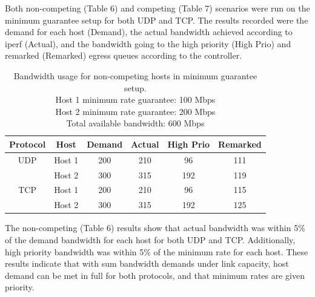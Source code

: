 \documentclass[accepted,single]{gipaper}
\begin{document}
Both non-competing (Table 6) and competing (Table 7) scenarios were run on the minimum guarantee setup for both UDP and TCP. The results recorded were the demand for each host (Demand), the actual bandwidth achieved according to iperf (Actual), and the bandwidth going to the high priority (High Prio) and remarked (Remarked) egress queues according to the controller. 

\begin{table}[h]
	\label{mg_nc}
	\vspace{-2mm}
	\begin{center}
		\begin{small}
		\setlength\tabcolsep{1.5pt}
			\begin{tabular}{cccccc}
				Protocol & Host & Demand & Actual & High Prio & Remarked \\
				\hline
				UDP & Host 1 & 200 & 210 & 96 & 111\\
				    & Host 2 & 300 & 315 & 192 & 119\\
				\hline
				TCP & Host 1 & 200 & 210 & 96 & 115\\
				    & Host 2 & 300 & 315 & 192 & 125\\
			\end{tabular}
		\end{small}
	\end{center}
	\caption{Bandwidth usage for non-competing hosts in minimum guarantee setup.\\
	Host 1 minimum rate guarantee: 100 Mbps\\
	Host 2 minimum rate guarantee: 200 Mbps\\	
	Total available bandwidth: 600 Mbps}
	\vspace{-3mm}
\end{table}

The non-competing (Table 6) results show that actual bandwidth was within 5\% of the demand bandwidth for each host for both UDP and TCP. Additionally, high priority bandwidth was within 5\% of the minimum rate for each host. These results indicate that with sum bandwidth demands under link capacity, host demand can be met in full for both protocols, and that minimum rates are given priority.
\end{document}
